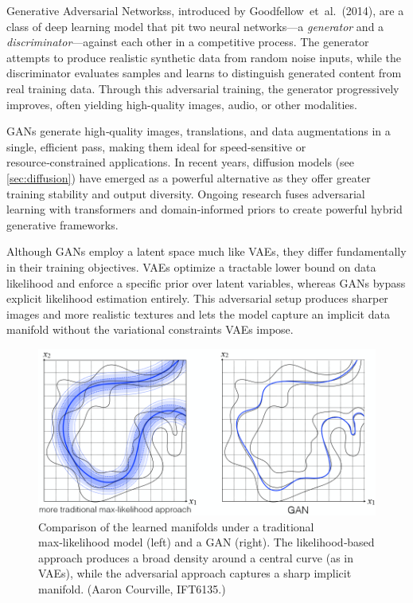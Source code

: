 \documentclass{article}
\begin{document}
Generative Adversarial Networkss, introduced by Goodfellow et al.\ (2014), are a class of deep learning model that pit two neural networks—a \emph{generator} and a \emph{discriminator}—against each other in a competitive process. The generator attempts to produce realistic synthetic data from random noise inputs, while the discriminator evaluates samples and learns to distinguish generated content from real training data. Through this adversarial training, the generator progressively improves, often yielding high-quality images, audio, or other modalities.

GANs generate high‑quality images, translations, and data augmentations in a single, efficient pass, making them ideal for speed‑sensitive or resource‑constrained applications. In recent years, diffusion models (see \ref{sec:diffusion}) have emerged as a powerful alternative as they offer greater training stability and output diversity. Ongoing research fuses adversarial learning with transformers and domain‑informed priors to create powerful hybrid generative frameworks.

Although GANs employ a latent space much like VAEs, they differ fundamentally in their training objectives. VAEs optimize a tractable lower bound on data likelihood and enforce a specific prior over latent variables, whereas GANs bypass explicit likelihood estimation entirely. This adversarial setup produces sharper images and more realistic textures and lets the model capture an implicit data manifold without the variational constraints VAEs impose.

\begin{figure}[ht]
    \centering
    \includegraphics[width=0.75\linewidth]{graphics/S9GAN/manifold_gan.png}
    \caption{Comparison of the learned manifolds under a traditional max‑likelihood model (left) and a GAN (right). The likelihood‑based approach produces a broad density around a central curve (as in VAEs), while the adversarial approach captures a sharp implicit manifold. (Aaron Courville, IFT6135.)}
    \label{fig:manifold_gan_vs_vae}
\end{figure}
\end{document}
